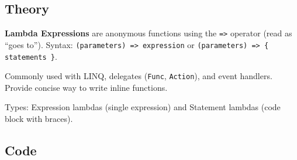 \documentclass[10pt,a4paper]{article}
\begin{document}
\subsection*{Theory}
\textbf{Lambda Expressions} are anonymous functions using the \texttt{=>} operator (read as ``goes to''). Syntax: \texttt{(parameters) => expression} or \texttt{(parameters) => \{ statements \}}.

Commonly used with LINQ, delegates (\texttt{Func}, \texttt{Action}), and event handlers. Provide concise way to write inline functions.

Types: Expression lambdas (single expression) and Statement lambdas (code block with braces).

\subsection*{Code}
\end{document}
